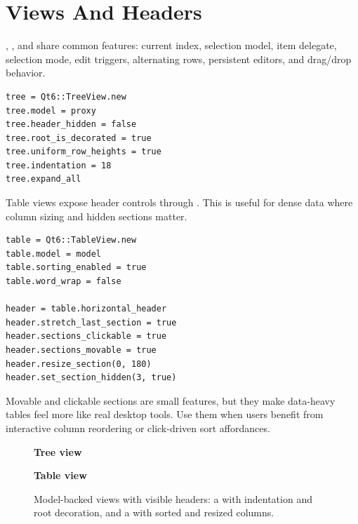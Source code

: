 \section{Views And Headers}

, , and  share common  features: current index, selection model, item delegate, selection mode, edit triggers, alternating rows, persistent editors, and drag/drop behavior.

\begin{lstlisting}[style=crystal]
tree = Qt6::TreeView.new
tree.model = proxy
tree.header_hidden = false
tree.root_is_decorated = true
tree.uniform_row_heights = true
tree.indentation = 18
tree.expand_all
\end{lstlisting}

Table views expose header controls through . This is useful for dense data where column sizing and hidden sections matter.

\begin{lstlisting}[style=crystal]
table = Qt6::TableView.new
table.model = model
table.sorting_enabled = true
table.word_wrap = false

header = table.horizontal_header
header.stretch_last_section = true
header.sections_clickable = true
header.sections_movable = true
header.resize_section(0, 180)
header.set_section_hidden(3, true)
\end{lstlisting}

Movable and clickable sections are small features, but they make data-heavy tables feel more like real desktop tools. Use them when users benefit from interactive column reordering or click-driven sort affordances.

\begin{figure}[htbp]
  \centering
  \begin{minipage}{0.86\textwidth}
    \centering
    \textbf{Tree view}\par\smallskip
  \end{minipage}\par\medskip
  \begin{minipage}{0.86\textwidth}
    \centering
    \textbf{Table view}\par\smallskip
  \end{minipage}
  \caption{Model-backed views with visible headers: a  with indentation and root decoration, and a  with sorted and resized columns.}
\end{figure}

